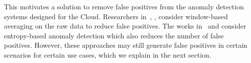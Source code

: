 This motivates a solution to remove false positives from the anomaly detection systems designed for the Cloud. 
Researchers in~\cite{automated-detection:2016}, \cite{UBL:2012}, \cite{cloud-malware:2016} consider window-based averaging on the raw data to reduce false positives. The works in~\cite{EbAT:2010} and \cite{entorpy_based_detection_2:2014} consider entropy-based anomaly detection which also reduces the number of false positives. However, these approaches may still generate false positives in certain scenarios for certain use cases, which we explain in the next section.

